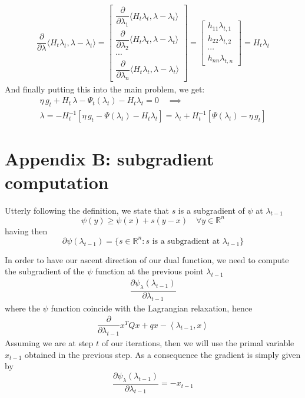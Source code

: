 \documentclass[notitlepage]{article}
\begin{document}
\begin{align*}
  \dfrac{\partial}{\partial \lambda} \langle H_t \lambda_t, \lambda - \lambda_t \rangle = 
  \begin{bmatrix}
    \dfrac{\partial}{\partial \lambda_1} \langle H_t \lambda_t, \lambda - \lambda_t \rangle \\[3ex]
    \dfrac{\partial}{\partial \lambda_2} \langle H_t \lambda_t, \lambda - \lambda_t \rangle \\[3ex]
    \cdots \\[3ex]
    \dfrac{\partial}{\partial \lambda_n} \langle H_t \lambda_t, \lambda - \lambda_t \rangle
  \end{bmatrix} 
  =
  \begin{bmatrix}
    h_{11} \lambda_{t,1} \\[2ex]
    h_{22} \lambda_{t,2} \\[2ex]
    \cdots \\[2ex]
    h_{nn} \lambda_{t,n}
  \end{bmatrix}
  = 
  H_t \lambda_t
\end{align*} 
And finally putting this into the main problem, we get:
\begin{align*}
  \eta\, g_t + H_t\, \lambda - \Psi_t(\lambda_t) - H_t \lambda_t = 0 \quad \implies \\
  \lambda = - H_t^{-1} \left[ \eta\, g_t - \Psi(\lambda_t) - H_t \lambda_t \right] = \lambda_t + H_t^{-1} \left[ \Psi(\lambda_t) - \eta\, g_t \right] 
\end{align*}


\section{Appendix B: subgradient computation}

Utterly following the definition, we state that $s$ is a subgradient of $\psi$ at $\lambda_{t-1}$
\[
  \psi(y) \ge \psi(x) + s(y-x) \quad \forall y \in \mathbb{R}^n  
\]
having then 
\[
  \partial \psi(\lambda_{t-1}) = \{ s \in \mathbb{R}^n : s \text{ is a subgradient at } \lambda_{t-1} \}
\]

In order to have our ascent direction of our dual function, we need to compute the subgradient of the $\psi$ function at the previous point $\lambda_{t-1}$
\begin{align*}
  \dfrac{\partial \psi_\lambda(\lambda_{t-1})}{\partial \lambda_{t-1}}
\end{align*}
where the $\psi$ function coincide with the Lagrangian relaxation, hence
\begin{align*}
  \dfrac{\partial}{\partial \lambda_{t-1}} x^T Q x + q x - \left\langle \lambda_{t-1},x \right\rangle
\end{align*}
Assuming we are at step $t$ of our iterations, then we will use the primal variable $x_{t-1}$ obtained in the previous step. As a consequence the gradient is simply given by
\[
  \dfrac{\partial \psi_\lambda(\lambda_{t-1})}{\partial \lambda_{t-1}} = - x_{t-1}
\]
\end{document}
